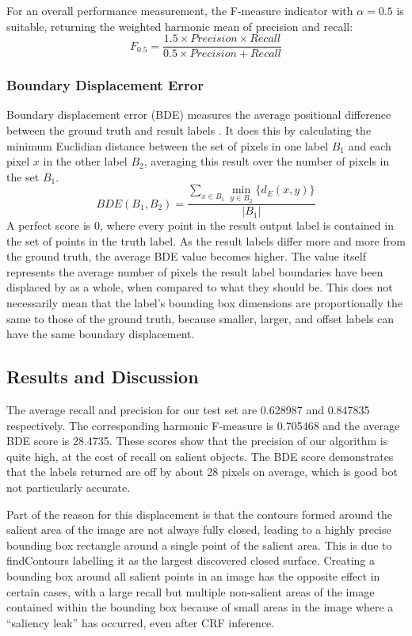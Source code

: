 \documentclass[10pt,twocolumn,letterpaper]{article}
\newcommand{\SUM}{\sum\limits}
\begin{document}
For an overall performance measurement, the F-measure indicator with $\alpha = 0.5$ is suitable, returning the weighted harmonic mean of precision and recall:$$F_{0.5} = \frac{1.5\times Precision \times Recall}{ 0.5 \times Precision + Recall}$$

\subsubsection{Boundary Displacement Error}
Boundary displacement error (BDE) measures the average positional difference between the ground truth and result labels \cite{bde}.  It does this by calculating the minimum Euclidian distance between the set of pixels in one label $B_1$ and each pixel $x$ in the other label $B_2$, averaging this result over the number of pixels in the set $B_1$. $$BDE(B_1,B_2)=\frac{\SUM_{x\in B_1}\min\limits_{y\in B_2}\{d_E(x,y)\}}{|B_1|}$$  A perfect score is 0, where every point in the result output label is contained in the set of points in the truth label.  As the result labels differ more and more from the ground truth, the average BDE value becomes higher.  The value itself represents the average number of pixels the result label boundaries have been displaced by as a whole, when compared to what they should be.  This does not necessarily mean that the label's bounding box dimensions are proportionally the same to those of the ground truth, because smaller, larger, and offset labels can have the same boundary displacement. 

\subsection{Results and Discussion}

The average recall and precision for our test set are 0.628987 and 0.847835 respectively.  The corresponding harmonic F-measure is 0.705468 and the average BDE score is 28.4735.  These scores show that the precision of our algorithm is quite high, at the cost of recall on salient objects.  The BDE score demonstrates that the labels returned are off by about 28 pixels on average, which is good bot not particularly accurate.

Part of the reason for this displacement is that the contours formed around the salient area of the image are not always fully closed, leading to a highly precise bounding box rectangle around a single point of the salient area.  This is due to findContours labelling it as the largest discovered closed surface.  Creating a bounding box around all salient points in an image has the opposite effect in certain cases, with a large recall but multiple non-salient areas of the image contained within the bounding box because of small areas in the image where a ``saliency leak'' has occurred, even after CRF  inference.
\end{document}
